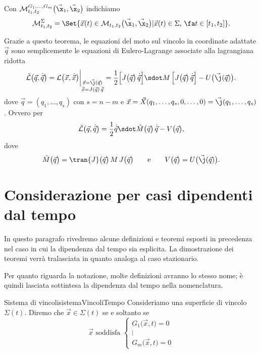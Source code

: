 \begin{notz}
	Con \(\mathcal{M}_{t_1,t_2}^{G_1,\ldots,G_m}\big(\vec{\x}_1,\vec{\x}_2\big)\) indichiamo 
	\[
		\mathcal{M}_{t_1,t_2}^\Sigma = \Set{\vec{x}(t) \in \mathcal{M}_{t_1,t_2}\big(\vec{\x}_1,\vec{\x}_2\big) | \vec{x}(t) \in \Sigma,\,\fa t \in [t_1,t_2]}.
	\]
\end{notz}

\begin{oss}
	Grazie a questo teorema, le equazioni del moto sul vincolo in coordinate adattate \(\vec{q}\) sono semplicemente le equazioni di Eulero-Lagrange associate  alla lagrangiana ridotta
	\[
		\tilde{\mathcal{L}}\big(\vec{q},\dot{\vec{q}}\big) = \mathcal{L}\big(\vec{x},\dot{\vec{x}}\big)\bigg|_{\substack{\vec{x}=\vec{\j}(\vec{q})\\\dot{\vec{x}}=J(\vec{q})\,\dot{\vec{q}}}} = \frac{1}{2}\Big[J\big(\vec{q}\big)\,\dot{\vec{q}}\Big] \sdot M\,\Big[J\big(\vec{q}\big)\,\dot{\vec{q}}\Big] - U\big(\vec{\j}(\vec{q})\big).
	\]
	dove \(\vec{q}=(q_1,\ldots,q_s)\) con \(s=n-m\) e \(\vec{x}=\vec{X}(q_1,\ldots,q_s,0,\ldots,0)=\vec{\j}(q_1,\ldots,q_s)\). Ovvero per
	\[
		\tilde{\mathcal{L}}\big(\vec{q},\dot{\vec{q}}\big) = \frac{1}{2}\dot{\vec{q}} \sdot \tilde{M}\big(\vec{q}\big)\,\dot{\vec{q}} - V\big(\vec{q}\big),
	\]
	dove
	\[
		\tilde{M}\big(\vec{q}\big) = \tran{J}\big(\vec{q}\big)\,M\,J\big(\vec{q}\big) \qquad\text{e}\qquad V\big(\vec{q}\big) = U\big(\vec{\j}(\vec{q})\big).
	\]
\end{oss}
%
%
\section{Considerazione per casi dipendenti dal tempo}

In questo paragrafo rivedremo alcune definizioni e teoremi esposti in precedenza nel caso in cui la dipendenza dal tempo sia esplicita. La dimostrazione dei teoremi verrà tralasciata in quanto analoga al caso stazionario.

Per quanto riguarda la notazione, molte definizioni avranno lo stesso nome; è quindi lasciata sottintesa la dipendenza dal tempo nella nomenclatura.

\begin{defn}{Sistema di vincoli}{sistemaVincoliTempo}
	Consideriamo una superficie di vincolo \(\Sigma(t)\). Diremo che \(\vec{x}\in\Sigma(t)\) se e soltanto se
	\[
		\vec{x} \text{ soddisfa } 	\begin{cases}
			G_1\big(\vec{x},t\big) = 0 \\
			\vdots                     \\
			G_m\big(\vec{x},t\big) = 0
		\end{cases}
	\]
\end{defn}


